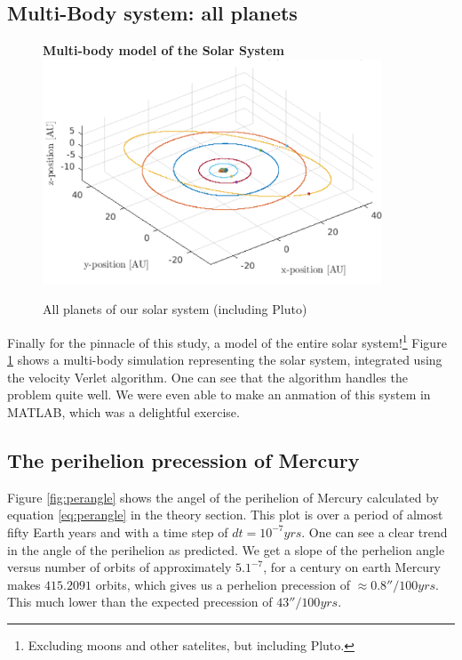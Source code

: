 \documentclass[10pt,a4paper]{amsart}
\begin{document}
\subsection{Multi-Body system: all planets}

\begin{figure}
	\centering
	\textbf{Multi-body model of the Solar System}
	\includegraphics[width=0.9\textwidth]{../figures/multibody.png}
	\caption{All planets of our solar system (including Pluto) \label{fig:multibody}}
\end{figure}

Finally for the pinnacle of this study, a model of the entire solar system!\footnote{Excluding moons and other satelites, but including Pluto.} Figure \ref{fig:multibody} shows a multi-body simulation representing the solar system, integrated using the velocity Verlet algorithm. One can see that the algorithm handles the problem quite well. We were even able to make an anmation of this system in MATLAB, which was a delightful exercise.

\subsection{The perihelion precession of Mercury}

Figure \ref{fig:perangle} shows the angel of the perihelion of Mercury calculated by equation \ref{eq:perangle} in the theory section. This plot is over a period of almost fifty Earth years and with a time step of $dt = 10^{-7}yrs$. One can see a clear trend in the angle of the perihelion as predicted. We get a slope of the perhelion angle versus number of orbits of approximately $5.1^{-7}$, for a century on earth Mercury makes $415.2091$ orbits, which gives us a perhelion precession of $\approx0.8''/100yrs$. This much lower than the expected precession of $43''/100yrs$.
\end{document}
